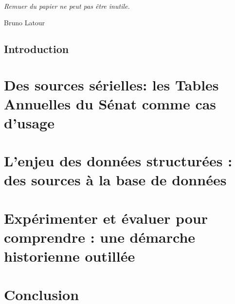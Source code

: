 \documentclass[12pt,twoside]{book}
\begin{document}

\chapter{}
\vspace*{\fill} 
\epigraph{\itshape Remuer du papier ne peut pas être inutile.}{Bruno Latour}

\vfill\clearpage

	
\chapter{Introduction}	


\newpage{\pagestyle{empty}\cleardoublepage}


\mainmatter

\part{Des sources sérielles: les Tables Annuelles du Sénat comme cas d'usage}






\part{L'enjeu des données structurées : des sources à la base de données}






\part{Expérimenter et évaluer pour comprendre : une démarche historienne outillée}

%




\part{Conclusion}
\end{document}

